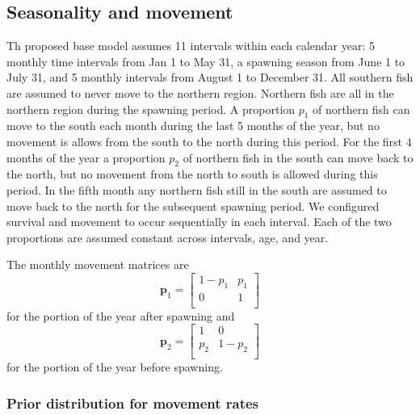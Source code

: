 \documentclass[
]{article}
\begin{document}
\hypertarget{seasonality-and-movement}{%
\subsection{Seasonality and movement}\label{seasonality-and-movement}}

Th proposed base model assumes 11 intervals within each calendar year: 5 monthly time intervals from Jan 1 to May 31, a spawning season from June 1 to July 31, and 5 monthly intervals from August 1 to December 31. All southern fish are assumed to never move to the northern region. Northern fish are all in the northern region during the spawning period. A proportion \(p_1\) of northern fish can move to the south each month during the last 5 months of the year, but no movement is allows from the south to the north during this period. For the first 4 months of the year a proportion \(p_2\) of northern fish in the south can move back to the north, but no movement from the north to south is allowed during this period. In the fifth month any northern fish still in the south are assumed to move back to the north for the subsequent spawning period. We configured survival and movement to occur sequentially in each interval. Each of the two proportions are assumed constant across intervals, age, and year.

The monthly movement matrices are
\begin{equation*}
\mathbf{p}_{1} = 
  \begin{bmatrix}
     1-p_1 & p_1 \\
     0 & 1 \\
  \end{bmatrix}
\end{equation*}
for the portion of the year after spawning and
\begin{equation*}
\mathbf{p}_{2} = 
  \begin{bmatrix}
     1 &  0 \\
     p_2 & 1-p_2 \\
  \end{bmatrix}
\end{equation*}
for the portion of the year before spawning.

\hypertarget{prior-distribution-for-movement-rates}{%
\subsubsection{Prior distribution for movement rates}\label{prior-distribution-for-movement-rates}}
\end{document}
